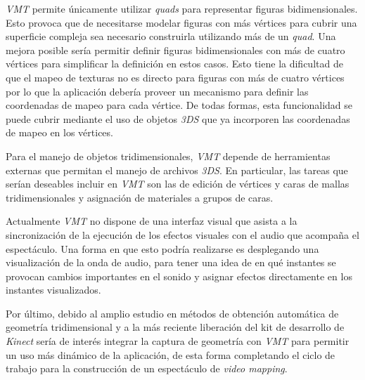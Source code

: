 \emph{VMT} permite únicamente utilizar \emph{quads} para representar figuras bidimensionales. Esto provoca que de necesitarse modelar figuras con más vértices para cubrir una superficie compleja sea necesario construirla utilizando más de un \emph{quad}. Una mejora posible sería permitir definir figuras bidimensionales con más de cuatro vértices para simplificar la definición en estos casos. Esto tiene la dificultad de que el mapeo de texturas no es directo para figuras con más de cuatro vértices por lo que la aplicación debería proveer un mecanismo para definir las coordenadas de mapeo para cada vértice. De todas formas, esta funcionalidad se puede cubrir mediante el uso de objetos \emph{3DS} que ya incorporen las coordenadas de mapeo en los vértices.

Para el manejo de objetos tridimensionales, \emph{VMT} depende de herramientas externas que permitan el manejo de archivos \emph{3DS}. En particular, las tareas que serían deseables incluir en \emph{VMT} son las de edición de vértices y caras de mallas tridimensionales y asignación de materiales a grupos de caras.

Actualmente \emph{VMT} no dispone de una interfaz visual que asista a la sincronización de la ejecución de los efectos visuales con el audio que acompaña el espectáculo.
Una forma en que esto podría realizarse es desplegando una visualización de la onda de audio, para tener una idea de en qué instantes se provocan cambios importantes en el sonido y asignar efectos directamente en los instantes visualizados.

Por último, debido al amplio estudio en métodos de obtención automática de geometría tridimensional y a la más reciente liberación del kit de desarrollo de \emph{Kinect} sería de interés integrar la captura de geometría con \emph{VMT} para permitir un uso más dinámico de la aplicación, de esta forma completando el ciclo de trabajo para la construcción de un espectáculo de \emph{video mapping}.
